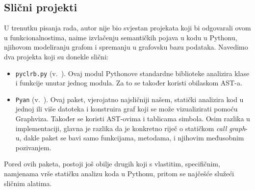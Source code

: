 \subsection{Slični projekti}

U trenutku pisanja rada, autor nije bio svjestan projekata
koji bi odgovarali ovom u funkcionalnostima, naime
izvlačenju semantičkih pojava u kodu u Pythonu, njihovom modeliranju
grafom i spremanju u grafovsku bazu podataka. Navedimo
dva projekta koji su donekle slični:

\begin{itemize}

\item \texttt{pyclrb.py} (v.\ \cite{docs:pyclbr}). Ovaj modul Pythonove
standardne biblioteke analizira klase i funkcije unutar jednog modula.
Za to se također koristi obilaskom AST-a.

\item \texttt{Pyan} (v.\ \cite{repo:pyan}). Ovaj paket, vjerojatno
najsličniji našem, statički analizira kod u jednoj ili više datoteka i
konstruira graf koji se može vizualizirati pomoću Graphviza. Također se
koristi AST-ovima i tablicama simbola. Osim razlika u implementaciji,
glavna je razlika da je konkretno riječ o statičkom \emph{call graph}-u,
dakle paket se bavi samo funkcijama, metodama, i njihovim međusobnim
pozivanjem.

\end{itemize}

Pored ovih paketa, postoji još obilje drugih koji s vlastitim, specifičnim,
namjenama vrše statičku analizu koda u Pythonu, pritom se
najčešće služeći sličnim alatima.



